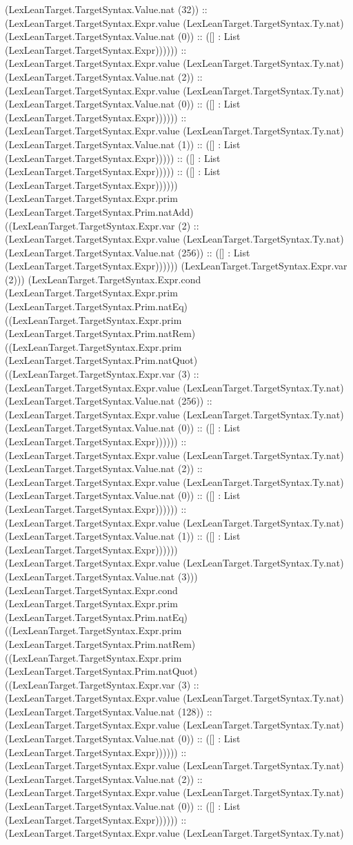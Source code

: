 \documentclass[11pt]{article}
\begin{document}
(LexLeanTarget.TargetSyntax.Value.nat (32)) :: (LexLeanTarget.TargetSyntax.Expr.value (LexLeanTarget.TargetSyntax.Ty.nat) (LexLeanTarget.TargetSyntax.Value.nat (0)) :: ([] : List (LexLeanTarget.TargetSyntax.Expr)))))) :: (LexLeanTarget.TargetSyntax.Expr.value (LexLeanTarget.TargetSyntax.Ty.nat) (LexLeanTarget.TargetSyntax.Value.nat (2)) :: (LexLeanTarget.TargetSyntax.Expr.value (LexLeanTarget.TargetSyntax.Ty.nat) (LexLeanTarget.TargetSyntax.Value.nat (0)) :: ([] : List (LexLeanTarget.TargetSyntax.Expr)))))) :: (LexLeanTarget.TargetSyntax.Expr.value (LexLeanTarget.TargetSyntax.Ty.nat) (LexLeanTarget.TargetSyntax.Value.nat (1)) :: ([] : List (LexLeanTarget.TargetSyntax.Expr))))) :: ([] : List (LexLeanTarget.TargetSyntax.Expr))))) :: ([] : List (LexLeanTarget.TargetSyntax.Expr)))))) (LexLeanTarget.TargetSyntax.Expr.prim (LexLeanTarget.TargetSyntax.Prim.natAdd) ((LexLeanTarget.TargetSyntax.Expr.var (2) :: (LexLeanTarget.TargetSyntax.Expr.value (LexLeanTarget.TargetSyntax.Ty.nat) (LexLeanTarget.TargetSyntax.Value.nat (256)) :: ([] : List (LexLeanTarget.TargetSyntax.Expr)))))) (LexLeanTarget.TargetSyntax.Expr.var (2))) (LexLeanTarget.TargetSyntax.Expr.cond (LexLeanTarget.TargetSyntax.Expr.prim (LexLeanTarget.TargetSyntax.Prim.natEq) ((LexLeanTarget.TargetSyntax.Expr.prim (LexLeanTarget.TargetSyntax.Prim.natRem) ((LexLeanTarget.TargetSyntax.Expr.prim (LexLeanTarget.TargetSyntax.Prim.natQuot) ((LexLeanTarget.TargetSyntax.Expr.var (3) :: (LexLeanTarget.TargetSyntax.Expr.value (LexLeanTarget.TargetSyntax.Ty.nat) (LexLeanTarget.TargetSyntax.Value.nat (256)) :: (LexLeanTarget.TargetSyntax.Expr.value (LexLeanTarget.TargetSyntax.Ty.nat) (LexLeanTarget.TargetSyntax.Value.nat (0)) :: ([] : List (LexLeanTarget.TargetSyntax.Expr)))))) :: (LexLeanTarget.TargetSyntax.Expr.value (LexLeanTarget.TargetSyntax.Ty.nat) (LexLeanTarget.TargetSyntax.Value.nat (2)) :: (LexLeanTarget.TargetSyntax.Expr.value (LexLeanTarget.TargetSyntax.Ty.nat) (LexLeanTarget.TargetSyntax.Value.nat (0)) :: ([] : List (LexLeanTarget.TargetSyntax.Expr)))))) :: (LexLeanTarget.TargetSyntax.Expr.value (LexLeanTarget.TargetSyntax.Ty.nat) (LexLeanTarget.TargetSyntax.Value.nat (1)) :: ([] : List (LexLeanTarget.TargetSyntax.Expr)))))) (LexLeanTarget.TargetSyntax.Expr.value (LexLeanTarget.TargetSyntax.Ty.nat) (LexLeanTarget.TargetSyntax.Value.nat (3))) (LexLeanTarget.TargetSyntax.Expr.cond (LexLeanTarget.TargetSyntax.Expr.prim (LexLeanTarget.TargetSyntax.Prim.natEq) ((LexLeanTarget.TargetSyntax.Expr.prim (LexLeanTarget.TargetSyntax.Prim.natRem) ((LexLeanTarget.TargetSyntax.Expr.prim (LexLeanTarget.TargetSyntax.Prim.natQuot) ((LexLeanTarget.TargetSyntax.Expr.var (3) :: (LexLeanTarget.TargetSyntax.Expr.value (LexLeanTarget.TargetSyntax.Ty.nat) (LexLeanTarget.TargetSyntax.Value.nat (128)) :: (LexLeanTarget.TargetSyntax.Expr.value (LexLeanTarget.TargetSyntax.Ty.nat) (LexLeanTarget.TargetSyntax.Value.nat (0)) :: ([] : List (LexLeanTarget.TargetSyntax.Expr)))))) :: (LexLeanTarget.TargetSyntax.Expr.value (LexLeanTarget.TargetSyntax.Ty.nat) (LexLeanTarget.TargetSyntax.Value.nat (2)) :: (LexLeanTarget.TargetSyntax.Expr.value (LexLeanTarget.TargetSyntax.Ty.nat) (LexLeanTarget.TargetSyntax.Value.nat (0)) :: ([] : List (LexLeanTarget.TargetSyntax.Expr)))))) :: (LexLeanTarget.TargetSyntax.Expr.value (LexLeanTarget.TargetSyntax.Ty.nat) 
\end{document}
